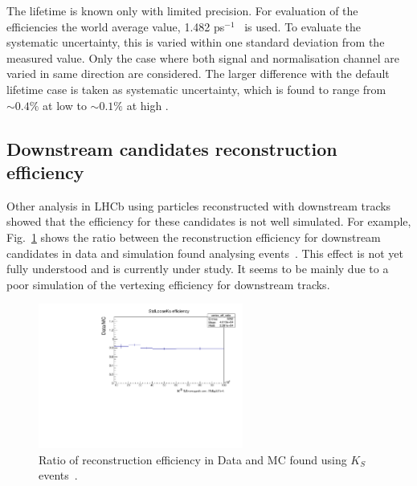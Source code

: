 The \Lb lifetime is known only with limited precision. For evaluation of the efficiencies the
world average value, 1.482 ps$^{-1}$~\cite{Aaij:2013oha} is used. To evaluate the systematic uncertainty,
this is varied within one standard deviation from the measured value.
Only the case where both signal and normalisation channel are varied in same direction are considered.
The larger difference with the default lifetime case is taken as systematic uncertainty,
which is found to range from $\sim 0.4\%$ at low \qsq to $\sim 0.1\%$ at high \qsq.

\subsection{Downstream candidates reconstruction efficiency}


Other analysis in LHCb using particles reconstructed with downstream tracks showed that
the efficiency for these candidates is not well simulated.
For example, Fig.~\ref{KS_vtxeff} shows the ratio between the reconstruction efficiency for downstream candidates
in data and simulation found analysing \KS events~\cite{Blake:1631348}. This effect is not
yet fully understood and is currently under study. It seems to be mainly due to a poor simulation
of the vertexing efficiency for downstream tracks.

\begin{figure}
\centering
\includegraphics[width=0.6\textwidth]{Lmumu/figs/DDvtx_eff_POwen.pdf}
\caption{Ratio of reconstruction efficiency in Data and MC found using $K_S$ events~\cite{Blake:1631348}.}
\label{KS_vtxeff}
\end{figure}

